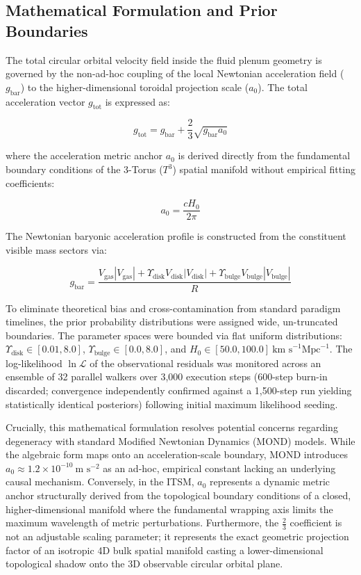 \documentclass[aps,prd,10pt,onecolumn,superscriptaddress,nofootinbib]{revtex4-2}
\begin{document}
\subsection{Mathematical Formulation and Prior Boundaries}

The total circular orbital velocity field inside the fluid plenum geometry is governed by the non-ad-hoc coupling of the local Newtonian acceleration field ($g_{\text{bar}}$) to the higher-dimensional toroidal projection scale ($a_0$). The total acceleration vector $g_{\text{tot}}$ is expressed as:

\begin{equation}
g_{\text{tot}} = g_{\text{bar}} + \frac{2}{3}\sqrt{g_{\text{bar}} a_0}
\end{equation}

where the acceleration metric anchor $a_0$ is derived directly from the fundamental boundary conditions of the 3-Torus ($T^3$) spatial manifold without empirical fitting coefficients:

\begin{equation}
a_0 = \frac{c H_0}{2\pi}
\end{equation}

The Newtonian baryonic acceleration profile is constructed from the constituent visible mass sectors via:

\begin{equation}
g_{\text{bar}} = \frac{V_{\text{gas}}|V_{\text{gas}}| + \Upsilon_{\text{disk}} V_{\text{disk}}|V_{\text{disk}}| + \Upsilon_{\text{bulge}} V_{\text{bulge}}|V_{\text{bulge}}|}{R}
\end{equation}

To eliminate theoretical bias and cross-contamination from standard paradigm timelines, the prior probability distributions were assigned wide, un-truncated boundaries. The parameter spaces were bounded via flat uniform distributions: $\Upsilon_{\text{disk}} \in [0.01, 8.0]$, $\Upsilon_{\text{bulge}} \in [0.0, 8.0]$, and $H_0 \in [50.0, 100.0] \ \text{km s}^{-1} \text{Mpc}^{-1}$. The log-likelihood $\ln \mathcal{L}$ of the observational residuals was monitored across an ensemble of 32 parallel walkers over 3,000 execution steps (600-step burn-in discarded; convergence independently confirmed against a 1,500-step run yielding statistically identical posteriors) following initial maximum likelihood seeding.

Crucially, this mathematical formulation resolves potential concerns regarding degeneracy with standard Modified Newtonian Dynamics (MOND) models. While the algebraic form maps onto an acceleration-scale boundary, MOND introduces $a_0 \approx 1.2 \times 10^{-10} \ \text{m s}^{-2}$ as an ad-hoc, empirical constant lacking an underlying causal mechanism. Conversely, in the ITSM, $a_0$ represents a dynamic metric anchor structurally derived from the topological boundary conditions of a closed, higher-dimensional manifold where the fundamental wrapping axis limits the maximum wavelength of metric perturbations. Furthermore, the $\frac{2}{3}$ coefficient is not an adjustable scaling parameter; it represents the exact geometric projection factor of an isotropic 4D bulk spatial manifold casting a lower-dimensional topological shadow onto the 3D observable circular orbital plane.
\end{document}
